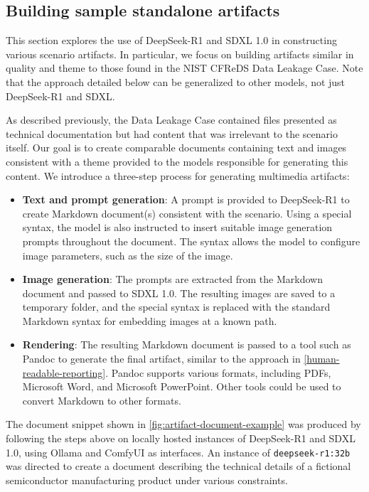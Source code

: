 \documentclass[letterpaper,12pt]{report}
\def\tightlist{}
\newcommand{\passthrough}[1]{#1}
\begin{document}
\subsection{Building sample standalone
artifacts}\label{building-sample-standalone-artifacts}

This section explores the use of DeepSeek-R1
\cite{deepseek-aiDeepSeekR1IncentivizingReasoning2025} and SDXL 1.0
\cite{podellSDXLImprovingLatent2023} in constructing various
scenario artifacts. In particular, we focus on building artifacts
similar in quality and theme to those found in the NIST CFReDS Data
Leakage Case. Note that the approach detailed below can be generalized
to other models, not just DeepSeek-R1 and SDXL.

As described previously, the Data Leakage Case contained files presented
as technical documentation but had content that was irrelevant to the
scenario itself. Our goal is to create comparable documents containing
text and images consistent with a theme provided to the models
responsible for generating this content. We introduce a three-step
process for generating multimedia artifacts:

\begin{itemize}
\tightlist
\item
  \textbf{Text and prompt generation}: A prompt is provided to
  DeepSeek-R1 to create Markdown document(s) consistent with the
  scenario. Using a special syntax, the model is also instructed to
  insert suitable image generation prompts throughout the document. The
  syntax allows the model to configure image parameters, such as the
  size of the image.
\item
  \textbf{Image generation}: The prompts are extracted from the Markdown
  document and passed to SDXL 1.0. The resulting images are saved to a
  temporary folder, and the special syntax is replaced with the standard
  Markdown syntax for embedding images at a known path.
\item
  \textbf{Rendering}: The resulting Markdown document is passed to a
  tool such as Pandoc to generate the final artifact, similar to the
  approach in \autoref{human-readable-reporting}. Pandoc supports various formats, including PDFs, Microsoft
  Word, and Microsoft PowerPoint. Other tools could be used to convert
  Markdown to other formats.
\end{itemize}

The document snippet shown in \autoref{fig:artifact-document-example}
was produced by following the steps above on locally hosted instances of
DeepSeek-R1 and SDXL 1.0, using Ollama \cite{OllamaOllama2025} and
ComfyUI \cite{comfyanonymousComfyanonymousComfyUI2025} as
interfaces. An instance of \passthrough{\lstinline!deepseek-r1:32b!} was
directed to create a document describing the technical details of a
fictional semiconductor manufacturing product under various constraints.
\end{document}
